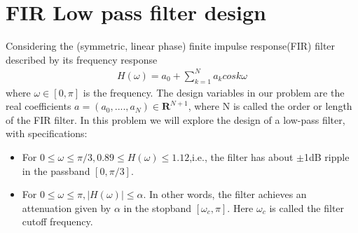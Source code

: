 \documentclass[conference]{IEEEtran}
\begin{document}
\section{FIR Low pass filter design}
Considering the (symmetric, linear phase) finite impulse response(FIR) filter described by its frequency response
\begin{align}
H(\omega) = a_0 + \sum_{k=1}^{N}a_kcosk\omega
\end{align}
where $\omega \in [0,\pi]$ is the frequency. The design variables in our problem are the real coefficients $a = (a_0,....,a_N)\in \textbf{R}^{N+1}$, where N is called the order or length of the FIR filter. In this problem we will explore the design of a low-pass filter, with specifications:
\begin{itemize}
\item For $0\le\omega\le\pi/3,0.89\le H(\omega)\le1.12$,i.e., the filter has about $\pm$1dB ripple in the passband $[0,\pi/3]$.
\item For $0\le\omega\le\pi, |H(\omega)|\le \alpha$. In other words, the filter achieves an attenuation given by $\alpha$ in the stopband $[\omega_c,\pi]$. Here $\omega_c$ is called the filter cutoff frequency.
\end{itemize} 
\end{document}
